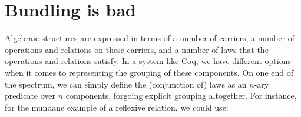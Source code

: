 \documentclass[a4paper,10pt,runningheads]{llncs}
\begin{document}
% 




\section{Bundling is bad}\label{bundling}

Algebraic structures are expressed in terms of a number of carriers, a number of operations and relations on these carriers, and a number of laws that the operations and relations satisfy. In a system like Coq, we have different options when it comes to representing the grouping of these components. On one end of the spectrum, we can simply define the (conjunction of) laws as an $n$-ary predicate over $n$ components, forgoing explicit grouping altogether. For instance, for the mundane example of a reflexive relation, we could use:
\end{document}
